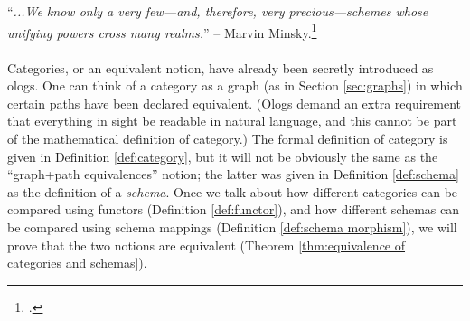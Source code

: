 
\chapter{}\label{chap:categories}

“{\it ...We know only a very few—and, therefore, very precious—schemes whose unifying powers cross many realms.}” -- Marvin Minsky.\footnote{\cite[Problems of disunity, p. 126]{Min}.}\\\\

Categories, or an equivalent notion, have already been secretly introduced as ologs. One can think of a category as a graph (as in Section \ref{sec:graphs}) in which certain paths have been declared equivalent. (Ologs demand an extra requirement that everything in sight be readable in natural language, and this cannot be part of the mathematical definition of category.) The formal definition of category is given in Definition \ref{def:category}, but it will not be obviously the same as the “graph+path equivalences” notion; the latter was given in Definition \ref{def:schema} as the definition of a {\em schema}. Once we talk about how different categories can be compared using functors (Definition \ref{def:functor}), and how different schemas can be compared using schema mappings (Definition \ref{def:schema morphism}), we will prove that the two notions are equivalent (Theorem \ref{thm:equivalence of categories and schemas}).

